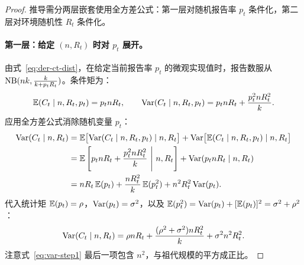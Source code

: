 \begin{proof}
推导需分两层嵌套使用全方差公式：第一层对随机报告率 $p_t$ 条件化，第二层对环境随机性 $R_t$ 条件化。

\paragraph{第一层：给定 $(n, R_t)$ 时对 $p_t$ 展开。}
由式~\eqref{eq:der-ct-dist}，在给定当前报告率 $p_t$ 的微观实现值时，报告数服从 $\mathrm{NB}(nk, \frac{k}{k+p_t R_t})$。条件矩为：
\begin{equation}
  \mathbb{E}(C_t \mid n, R_t, p_t) = p_t n R_t, \qquad \mathrm{Var}(C_t \mid n, R_t, p_t) = p_t n R_t + \frac{p_t^2 n R_t^2}{k}.
\end{equation}
应用全方差公式消除随机变量 $p_t$：
\begin{align}
  \mathrm{Var}(C_t \mid n, R_t) &= \mathbb{E}\big[ \mathrm{Var}(C_t \mid n, R_t, p_t) \mid n, R_t \big] + \mathrm{Var}\big[ \mathbb{E}(C_t \mid n, R_t, p_t) \mid n, R_t \big] \nonumber \\
  &= \mathbb{E}\left[ p_t n R_t + \frac{p_t^2 n R_t^2}{k} \ \Bigg|\ n, R_t \right] + \mathrm{Var}(p_t n R_t \mid n, R_t) \nonumber \\
  &= n R_t \, \mathbb{E}(p_t) + \frac{n R_t^2}{k} \, \mathbb{E}(p_t^2) + n^2 R_t^2 \, \mathrm{Var}(p_t).
\end{align}
代入统计矩 $\mathbb{E}(p_t) = \rho$，$\mathrm{Var}(p_t) = \sigma^2$，以及 $\mathbb{E}(p_t^2) = \mathrm{Var}(p_t) + [\mathbb{E}(p_t)]^2 = \sigma^2 + \rho^2$：
\begin{equation}
  \mathrm{Var}(C_t \mid n, R_t) = \rho n R_t + \frac{(\rho^2 + \sigma^2) n R_t^2}{k} + \sigma^2 n^2 R_t^2.
  \label{eq:var-step1}
\end{equation}
注意式~\eqref{eq:var-step1} 最后一项包含 $n^2$，与祖代规模的平方成正比。


\end{proof}
